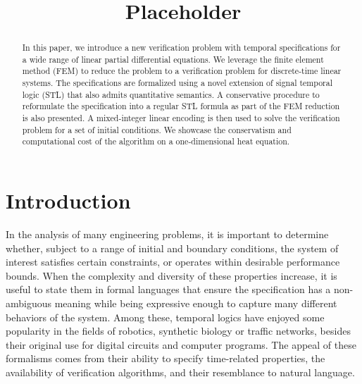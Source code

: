 \documentclass[oribibl]{llncs/llncs}
\title{Placeholder}
\begin{document}
\maketitle

\begin{abstract}


    In this paper, we introduce a new verification problem with temporal
    specifications for a wide range of linear partial differential equations. 
    We leverage the finite
    element method (FEM) to reduce the problem to a verification problem for
    discrete-time linear systems. The specifications are formalized using a
    novel extension of signal temporal logic (STL) that also admits quantitative
    semantics. A conservative procedure to reformulate the specification into a
    regular STL formula as part of the FEM reduction is also presented. A
    mixed-integer linear encoding is then used to solve the verification problem
    for a set of initial conditions.
    We showcase the conservatism and computational cost of the algorithm on a
    one-dimensional heat equation.

\end{abstract}

\section{Introduction}
\label{sec:introduction}

In the analysis of many engineering problems, it is important to determine
whether, subject to a range of initial and boundary conditions, the system of
interest satisfies certain constraints, or operates within desirable performance
bounds. When the complexity
and diversity of these properties increase, it is useful to state them in
formal languages  that ensure the specification has a
non-ambiguous meaning while being expressive enough to capture many different
behaviors of the system. Among these, temporal logics have enjoyed some
popularity in the fields of robotics, synthetic biology or traffic networks,
besides their original use for digital circuits and computer programs. The
appeal of these formalisms comes from their ability to specify time-related
properties, the availability of verification algorithms, and their resemblance
to natural language.
\end{document}
